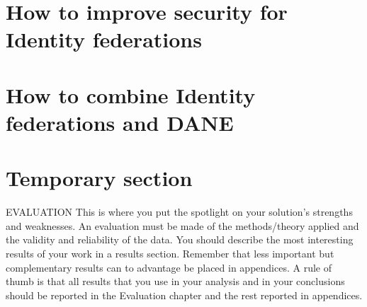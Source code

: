 \section{How to improve security for Identity federations}
\section{How to combine Identity federations and DANE}
\section{Temporary section}
EVALUATION This is where you put the spotlight on your solution's strengths and
weaknesses. An evaluation must be made of the methods/theory applied and the validity
and reliability of the data. You should describe the most interesting results of your work in a
results section. Remember that less important but complementary results can to advantage
be placed in appendices. A rule of thumb is that all results that you use in your analysis and
in your conclusions should be reported in the Evaluation chapter and the rest reported in
appendices.

